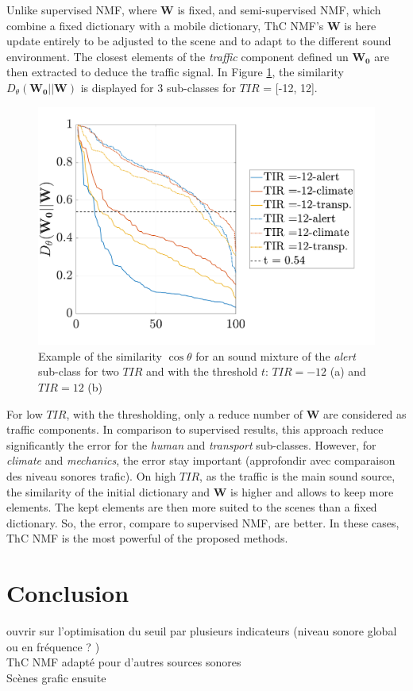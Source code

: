 \documentclass[twocolumn,a4paper,10pt]{article}
\begin{document}
Unlike supervised NMF, where $\mathbf{W}$ is fixed, and semi-supervised NMF, which combine a fixed dictionary with a mobile dictionary, ThC NMF's $\mathbf{W}$ is here update entirely to be adjusted to the scene and to adapt to the different sound environment. The closest elements of the \textit{traffic} component defined un $\mathbf{W_0}$ are then extracted to deduce the traffic signal. In Figure \ref{fig:dist_-12_12}, the similarity $D_{\theta}(\mathbf{W_0}||\mathbf{W})$ is displayed for 3 sub-classes for $TIR$ = [-12, 12]. 

\begin{figure}[t]
    \centering
    \includegraphics[width=\linewidth]{../image/dist_-12_12.pdf}    
    \caption{Example of the similarity $\cos \theta$ for an sound mixture of the \textit{alert} sub-class for two $TIR$ and with the threshold $t$: $TIR = -12$ (a) and $TIR = 12$ (b)}
    \label{fig:dist_-12_12}
\end{figure}

For low $TIR$, with the thresholding, only a reduce number of $\mathbf{W}$ are considered as traffic components. In comparison to supervised results, this approach reduce significantly the error for the \textit{human} and \textit{transport} sub-classes.  However, for \textit{climate} and \textit{mechanics}, the error stay important (approfondir avec comparaison des niveau sonores trafic). On high $TIR$, as the traffic is the main sound source, the similarity of the initial dictionary and $\mathbf{W}$ is higher and allows to keep more elements. The kept elements are then more suited to the scenes than a fixed dictionary. So, the error, compare to supervised NMF, are better. In these cases, ThC NMF is the most powerful of the proposed methods.  

\section{Conclusion}
ouvrir sur l'optimisation du seuil par plusieurs indicateurs (niveau sonore global ou en fréquence ? )\\
ThC NMF adapté pour d'autres sources sonores \\
Scènes grafic ensuite 

\footnotesize


\end{document}

